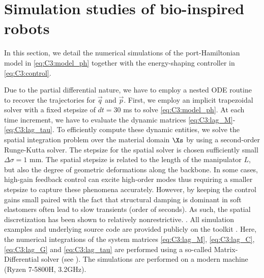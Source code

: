 \section{Simulation studies of bio-inspired robots} \label{sec:chap3_result}
In this section, we detail the numerical simulations of the port-Hamiltonian model in \eqref{eq:C3:model_ph} together with the energy-shaping controller in \eqref{eq:C3:control}. 

Due to the partial differential nature, we have to employ a nested ODE routine to recover the trajectories for $\vec{q}$ and $\vec{p}$. First, we employ an implicit trapezoidal solver with a fixed stepsize of $dt = 30 $ ms to solve \eqref{eq:C3:model_ph}. At each time increment, we have to evaluate the dynamic matrices \eqref{eq:C3:lag_M}-\eqref{eq:C3:lag_tau}. To efficiently compute these dynamic entities, we solve the spatial integration problem over the material domain $\Xs$ by using a second-order Runge-Kutta solver. \editl The stepsize for the spatial solver is chosen sufficiently small $\Delta \sigma = 1$ mm. The spatial stepsize is related to the length of the manipulator $L$, but also the degree of geometric deformations along the backbone. In some cases, high-gain feedback control can excite high-order modes thus requiring a smaller stepsize to capture these phenomena accurately. However, by keeping the control gains small paired with the fact that structural damping is dominant in soft elastomers often lead to slow transients (order of seconds). As such, the spatial discretization has been shown to relatively nonrestrictive. %
\editr. All simulation examples and underlying source code are provided publicly on the \sorotoki toolkit \cite{Caasenbrood2020}. Here, the numerical integrations of the system matrices \eqref{eq:C3:lag_M}, \eqref{eq:C3:lag_C}, \eqref{eq:C3:lag_G} and \eqref{eq:C3:lag_tau} are performed using a so-called Matrix-Differential solver (see \cite{Caasenbrood2022}). The simulations are performed on a modern machine (Ryzen 7-5800H, 3.2GHz).

